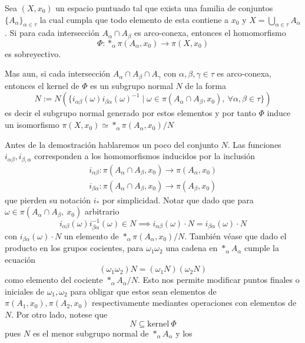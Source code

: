 \begin{teorema}[\vank]
  Sea \((X, x_0)\) un espacio puntuado tal que exista una familia de
  conjuntos \(\{A_\alpha\}_{\alpha \in \tau}\) la cual cumpla que todo
  elemento de esta contiene a \(x_0\) y \( X = \bigcup_{\alpha \in \tau} A_\alpha\). Si para cada
  intersección \(A_\alpha \cap A_\beta\) es arco-conexa, entonces el
  homomorfismo
  \[ \Phi : *_\alpha \pi (A_\alpha, x_0) \to \pi (X, x_0) \]
  es sobreyectivo.

  Mas aun, si cada intersección \(A_\alpha \cap A_\beta
  \cap A_\gamma\) con \( \alpha, \beta, \gamma \in \tau\) es arco-conexa,
  entonces el kernel de \(\Phi\) es un subgrupo normal \(N\) de la forma
  \[
    N := N \left( \{ i_{\alpha \beta} (\omega) i_{\beta \alpha} (\omega)^{-1}
    \mid \omega \in \pi \left( A_\alpha \cap A_\beta, x_0 \right),\
    \forall \alpha ,\beta \in \tau \} \right)
  \]
  es decir el subgrupo normal generado por estos elementos y por tanto
  \(\Phi\) induce un isomorfismo \(\pi (X, x_0) \simeq *_\alpha \pi
  (A_\alpha, x_0) / N \)
\end{teorema}
Antes de la demostración hablaremos un poco del conjunto \(N\). Las
funciones \(i_{\alpha \beta}, i_{\beta, \alpha}\) corresponden a los
homomorfismos inducidos por la inclusión
\begin{gather*}
  i_{\alpha \beta} : \pi (A_\alpha \cap A_\beta , x_0 ) \longrightarrow \pi (A_\alpha, x_0) \\
  i_{\beta \alpha} : \pi (A_\alpha \cap A_\beta , x_0 ) \longrightarrow \pi (A_\beta, x_0)
\end{gather*}
que pierden su notación \(i_*\) por simplicidad. Notar que dado que
para \(\omega \in \pi (A_\alpha \cap A_\beta ,\ x_0)\) arbitrario
\[ i_{\alpha \beta} (\omega) i_{\beta \alpha}^{-1} (\omega) \in N
  \implies i_{\alpha \beta} (\omega) \cdot N = i_{\beta
\alpha} (\omega) \cdot N \]
con \(i_{\beta \alpha} (\omega) \cdot N\) un elemento de \(*_\alpha
\pi (A_\alpha , x_0) / N\). También véase que dado el producto en los
grupos cocientes, para \(\omega_1 \omega_2 \) una cadena en \(*_\alpha
A_\alpha\) cumple la ecuación
\[ (\omega_1 \omega_2) N = (\omega_1 N) (\omega_2 N) \]
como elemento del cociente \(*_\alpha A_\alpha / N\). Esto nos permite
modificar puntos finales o iniciales de \(\omega_1, \omega_2\) para
obligar que estos sean elementos de \(\pi (A_1, x_0), \pi (A_2, x_0)\)
respectivamente mediantes operaciones con elementos de \(N\). Por otro
lado, notese que
\[ N \subseteq \text{kernel} \ \Phi \]
pues \(N\) es el menor subgrupo normal de \(*_\alpha A_\alpha\) y los

